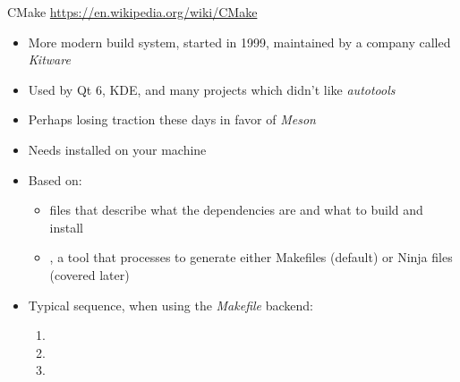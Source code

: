 \begin{frame}{CMake}
  \url{https://en.wikipedia.org/wiki/CMake}
  \begin{itemize}
  \item More modern build system, started in 1999, maintained by a
    company called {\em Kitware}
  \item Used by Qt 6, KDE, and many projects which didn't like {\em
      autotools}
  \item Perhaps losing traction these days in favor of {\em Meson}
  \item Needs  installed on your machine
  \item Based on:
    \begin{itemize}
    \item {} files that describe what the
      dependencies are and what to build and install
    \item {}, a tool that processes  to
      generate either Makefiles (default) or Ninja files (covered later)
    \end{itemize}
  \item Typical sequence, when using the {\em Makefile} backend:
    \begin{enumerate}
    \item {}
    \item {}
    \item {}
    \end{enumerate}
  \end{itemize}
\end{frame}

